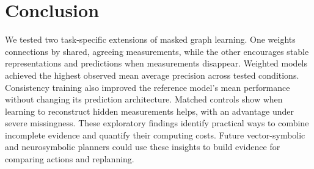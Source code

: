\documentclass[11pt,letterpaper]{article}
\begin{document}
\section{Conclusion}

We tested two task-specific extensions of masked graph learning. One weights connections by shared, agreeing measurements, while the other encourages stable representations and predictions when measurements disappear. Weighted models achieved the highest observed mean average precision across tested conditions. Consistency training also improved the reference model's mean performance without changing its prediction architecture. Matched controls show when learning to reconstruct hidden measurements helps, with an advantage under severe missingness. These exploratory findings identify practical ways to combine incomplete evidence and quantify their computing costs. Future vector-symbolic and neurosymbolic planners could use these insights to build evidence for comparing actions and replanning.\par
\end{document}
